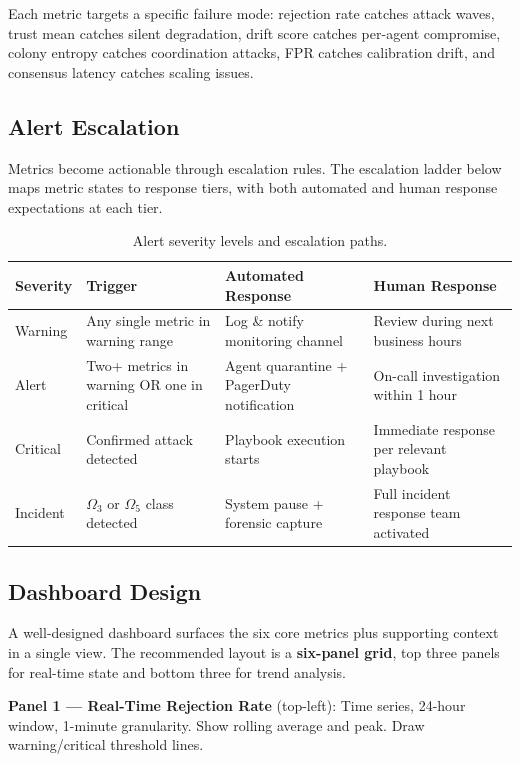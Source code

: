 \documentclass[
]{article}
\begin{document}
Each metric targets a specific failure mode: rejection rate catches
attack waves, trust mean catches silent degradation, drift score catches
per-agent compromise, colony entropy catches coordination attacks, FPR
catches calibration drift, and consensus latency catches scaling issues.

\subsection{Alert Escalation}\label{alert-escalation}

Metrics become actionable through escalation rules. The escalation
ladder below maps metric states to response tiers, with both automated
and human response expectations at each tier.

\begin{table}[htbp]
\centering
\caption{Alert severity levels and escalation paths.}
\label{tab:alert-escalation-ops}
\begin{tabular}{@{}lp{3.2cm}p{3.5cm}p{4.5cm}@{}}
\toprule
Severity & Trigger & Automated Response & Human Response \\
\midrule
Warning & Any single metric in warning range & Log \& notify monitoring channel & Review during next business hours \\
Alert & Two+ metrics in warning OR one in critical & Agent quarantine + PagerDuty notification & On-call investigation within 1 hour \\
Critical & Confirmed attack detected & Playbook execution starts & Immediate response per relevant playbook \\
Incident & $\Omega_3$ or $\Omega_5$ class detected & System pause + forensic capture & Full incident response team activated \\
\bottomrule
\end{tabular}
\end{table}

\subsection{Dashboard Design}\label{dashboard-design}

A well-designed dashboard surfaces the six core metrics plus supporting
context in a single view. The recommended layout is a \textbf{six-panel
grid}, top three panels for real-time state and bottom three for trend
analysis.

\textbf{Panel 1 --- Real-Time Rejection Rate} (top-left): Time series,
24-hour window, 1-minute granularity. Show rolling average and peak.
Draw warning/critical threshold lines.
\end{document}
